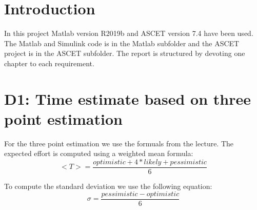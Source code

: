 
\chapter{Introduction}\label{cha:Introduction}
In this project Matlab version R2019b and ASCET version 7.4 have been used.
The Matlab and Simulink code is in the Matlab subfolder and the ASCET project is in the ASCET subfolder.
The report is structured by devoting one chapter to each requirement.

\chapter{D1: Time estimate based on three point estimation}\label{cha:D1}
For the three point estimation we use the formuals from the lecture.
The expected effort is computed using a weighted mean formula:
\begin{equation}
	<T> = \frac{optimistic + 4*likely + pessimistic}{6}
\end{equation}

To compute the standard deviation we use the following equation:
\begin{equation}
	\sigma = \frac{pessimistic-optimistic}{6}
\end{equation}

